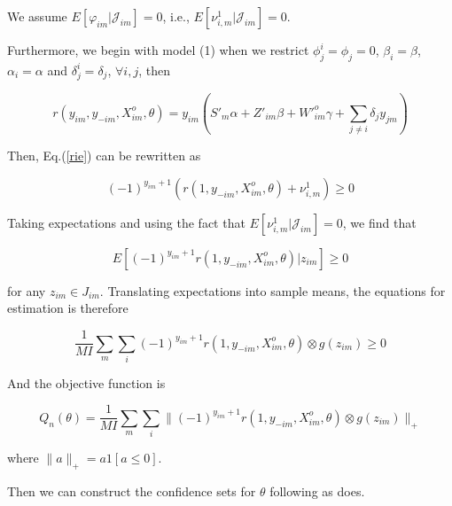 \documentclass[a4paper]{article}
\begin{document}
We assume $E[\varphi_{im}|\mathcal{J}_{im}] = 0$, i.e., $E[\nu^1_{i,m}|\mathcal{J}_{im}] = 0$.

Furthermore, we begin with model (1) when we restrict $\phi^i_j = \phi_j = 0$, $\beta_i=\beta$, $\alpha_i = \alpha$ and $\delta^i_j = \delta_j$, $\forall i, j$, then

$$r(y_{im},y_{-im},X^o_{im}, \theta) = y_{im}(S'_m\alpha+Z'_{im}\beta + W'^o_{im}\gamma + \sum_{j\neq i}\delta_j y_{jm})$$



Then, Eq.(\ref{rie}) can be rewritten as 

\begin{equation}
 (-1)^{y_{im}+1}(r(1,y_{-im},X^o_{im},\theta)+ \nu^1_{i,m} )\geq 0
\label{rie_PI}
\end{equation}

Taking expectations and using the fact that $E[\nu^1_{i,m}|\mathcal{J}_{im}] = 0$, we find that 


\begin{equation}
 E[(-1)^{y_{im}+1}r(1,y_{-im},X^o_{im},\theta)|z_{im}]\geq 0
\label{rie_PI_exp}
\end{equation}

for any $z_{im} \in J_{im}$. Translating expectations into sample means, the equations for estimation is therefore

\begin{equation}
\dfrac{1}{MI}\sum_m\sum_i(-1)^{y_{im}+1}r(1,y_{-im},X^o_{im},\theta) \otimes g(z_{im}) \geq 0
\end{equation}

And the objective function is 

$$Q_n(\theta) = \dfrac{1}{MI}\sum_m\sum_i\|(-1)^{y_{im}+1}r(1,y_{-im},X^o_{im},\theta) \otimes g(z_{im})\|_+$$

where $\|a\|_+ = a1[a \leq 0].$

Then we can construct the confidence sets for $\theta$ following \cite{chernozhukov2007estimation} as \cite{ciliberto2009market} does.
\end{document}
